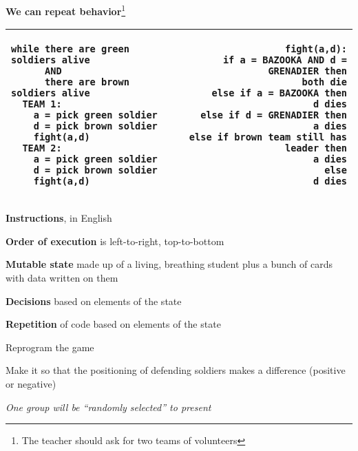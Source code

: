 \documentclass{beamer}
\begin{document}
\begin{frame}[fragile]
\textbf{We can repeat behavior}\footnote{The teacher should ask for two teams of volunteers} \ \\

\begin{tabular}{| l | r |}
\hline
\begin{lstlisting}[basicstyle=\ttfamily\tiny]
while there are green soldiers alive
      AND
      there are brown soldiers alive
  TEAM 1:
    a = pick green soldier
    d = pick brown soldier
    fight(a,d)
  TEAM 2:
    a = pick green soldier
    d = pick brown soldier
    fight(a,d)
\end{lstlisting}

&

\begin{lstlisting}[basicstyle=\ttfamily\tiny]
fight(a,d):
  if a = BAZOOKA AND d = GRENADIER then
    both die
  else if a = BAZOOKA then
    d dies
  else if d = GRENADIER then
    a dies
  else if brown team still has leader then
    a dies
  else
    d dies
\end{lstlisting} 

\\

\hline
\end{tabular}
\end{frame}

\begin{slide}{
\item \textbf{Instructions}, in English
\item \textbf{Order of execution} is left-to-right, top-to-bottom
\item \textbf{Mutable state} made up of a living, breathing student plus a bunch of cards with data written on them
\item \textbf{Decisions} based on elements of the state 
\item \textbf{Repetition} of code based on elements of the state 
}\end{slide}

\begin{slide}{
\item Reprogram the game
\item Make it so that the positioning of defending soldiers makes a difference (positive or negative)
\item \textit{One group will be ``randomly selected'' to present}
}\end{slide}
\end{document}
